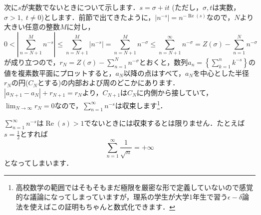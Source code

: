 \documentclass[./main]{subfile}
\begin{document}
次に$s$が実数でないときについて示します．$s=\sigma +it$ (ただし，$\sigma,t$は実数，$\sigma>1,\;t\neq 0$)とします．前節で出てきたように，$|n^{-s}|=n^{-\operatorname{Re}(s)}$なので，$N$より大きい任意の整数$M$に対し，
\[
0<\left|\sum_{n=N+1}^{M}n^{-s}\right|\leq\sum_{n=N+1}^{M}\left|n^{-s}\right|=\sum_{n=N+1}^{M}n^{-\sigma}\leq\sum_{n=N+1}^{\infty}n^{-\sigma}=Z(\sigma)-\sum_{n=1}^{N}n^{-\sigma}
\]
が成り立つので，$r_N=Z(\sigma)-\sum_{n=1}^{N}n^{-\sigma}$とおくと，数列${a_n}=\left\{\sum_{k=1}^nk^{-s}\right\}$の値を複素数平面にプロットすると，$a_N$以降の点はすべて，$a_N$を中心とした半径$r_N$の円($C_N$とする)の内部および周のどこかにあります．$|a_{N+1}-a_N|+r_{N+1}=r_N$より，$C_{N+1}$は$C_N$に内側から接していて，$\lim_{N\to\infty}r_N=0$なので，$\sum_{n=1}^{\infty}n^{-s}$は収束します\footnote{高校数学の範囲ではそもそもまだ極限を厳密な形で定義していないので感覚的な議論になってしまっていますが，理系の学生が大学1年生で習う$\epsilon-\delta$論法を使えばこの証明もちゃんと数式化できます．}．

$\sum_{n=1}^{\infty}n^{-s}$は$\operatorname{Re}(s)>1$でないときには収束するとは限りません．たとえば$s=\frac{1}{2}$とすれば
\[
\sum_{n=1}^{\infty}\frac{1}{\sqrt{n}}=+\infty
\]
となってしまいます．
\end{document}

